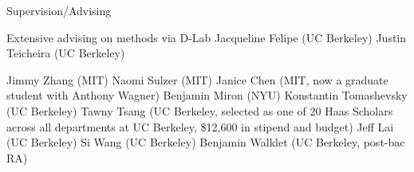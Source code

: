 \begin{rubric}{Supervision/Advising}

\entry* Extensive advising on methods via D-Lab
\entry* Jacqueline Felipe (UC Berkeley)
\entry* Justin Teicheira (UC Berkeley)

\entry* Jimmy Zhang (MIT)
\entry* Naomi Sulzer (MIT)
\entry* Janice Chen (MIT, now a graduate student with Anthony Wagner)
\entry* Benjamin Miron (NYU)
\entry* Konstantin Tomashevsky (UC Berkeley)
\entry* Tawny Tsang (UC Berkeley, selected as one of 20 Haas Scholars across all departments at UC
Berkeley, \$12,600 in stipend and budget)
\entry* Jeff Lai (UC Berkeley)
\entry* Si Wang (UC Berkeley)
\entry* Benjamin Walklet (UC Berkeley, post-bac RA)

\end{rubric}
